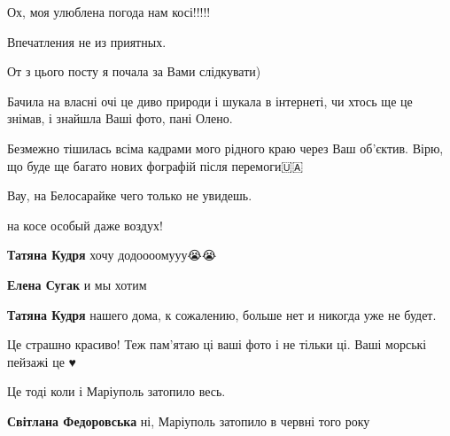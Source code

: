 
 
 
 
 

\qqSecCmt

\begin{itemize} %

Ох, моя улюблена погода нам косі!!!!!


Впечатления не из приятных.


От з цього посту я почала за Вами слідкувати)

Бачила на власні очі це диво природи і шукала в інтернеті, чи хтось ще це
знімав, і знайшла Ваші фото, пані Олено.

Безмежно тішилась всіма кадрами мого рідного краю через Ваш об'єктив. Вірю, що
буде ще багато нових фографій після перемоги🇺🇦


Вау, на Белосарайке чего только не увидешь.


на косе особый даже воздух!

\begin{itemize} %
\textbf{Татяна Кудря} хочу додоооомууу😭😭

\textbf{Елена Сугак} и мы хотим

\textbf{Татяна Кудря} нашего дома, к сожалению, больше нет и никогда уже не будет.
\end{itemize} %


Це страшно красиво! Теж пам'ятаю ці ваші фото і не тільки ці. Ваші морські пейзажі це ♥️


Це тоді коли і Маріуполь затопило весь.

\begin{itemize} %
\textbf{Світлана Федоровська} ні, Маріуполь затопило в червні того року


\end{itemize}
\end{itemize}
